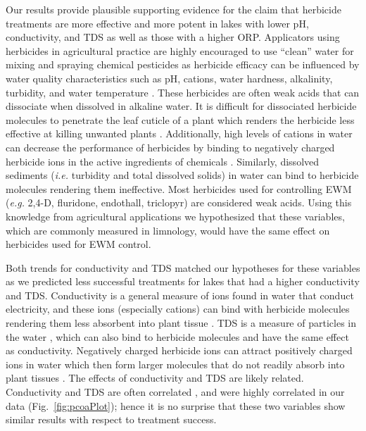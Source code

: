 \documentclass{article}
\begin{document}
Our results provide plausible supporting evidence for the claim that herbicide treatments are more effective and more potent in lakes with lower pH, conductivity, and TDS as well as those with a higher ORP. Applicators using herbicides in agricultural practice are highly encouraged to use ``clean'' water for mixing and spraying chemical pesticides as herbicide efficacy can be influenced by water quality characteristics such as pH, cations, water hardness, alkalinity, turbidity, and water temperature \citep{Roskamp2013, Chahal2012, Nalewaja1991, Orgell1957}.  These herbicides are often weak acids that can dissociate when dissolved in alkaline water. It is difficult for dissociated herbicide molecules to penetrate the leaf cuticle of a plant which renders the herbicide less effective at killing unwanted plants	 \citep{Baur1974}.  Additionally, high levels of cations in water can decrease the performance of herbicides by binding to negatively charged herbicide ions in the active ingredients of chemicals \citep{Roskamp2013}. Similarly, dissolved sediments (\emph{i.e.} turbidity and total dissolved solids) in water can bind to herbicide molecules rendering them ineffective. Most herbicides used for controlling EWM (\emph{e.g.} 2,4-D, fluridone, endothall, triclopyr) are considered weak acids. Using this knowledge from agricultural applications we hypothesized that these variables, which are commonly measured in limnology, would have the same effect on herbicides used for EWM control.

Both trends for conductivity and TDS matched our hypotheses for these variables as we predicted less successful treatments for lakes that had a higher conductivity and TDS. Conductivity is a general measure of ions found in water that conduct electricity, and these ions (especially cations) can bind with herbicide molecules rendering them less absorbent into plant tissue \citep{Chahal2012}. TDS is a measure of particles in the water \citep[mostly cations -- $\mathrm{Ca}^{2+}$, $\mathrm{Mg}^{2+}$, $\mathrm{Zi}^{++}$, and $\mathrm{Na}^{+}$][]{Hem1985}, which can also bind to herbicide molecules and have the same effect as conductivity. Negatively charged herbicide ions can attract positively charged ions in water which then form larger molecules that do not readily absorb into plant tissues \citep{Chahal2012}. The effects of conductivity and TDS are likely related. Conductivity and TDS are often correlated \citep{Hem1985}, and were highly correlated in our data (Fig.~\ref{fig:pcoaPlot}); hence it is no surprise that these two variables show similar results with respect to treatment success. 
\end{document}
